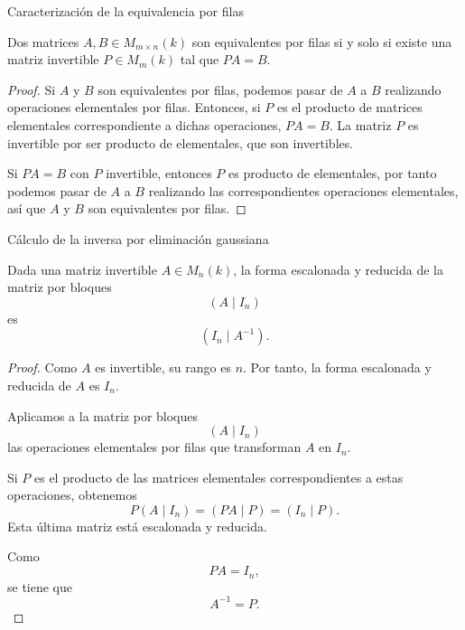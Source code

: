 \begin{frame}{Caracterización de la equivalencia por filas}

\begin{corollary}
	Dos matrices $A,B \in M_{m\times n}(k)$ son equivalentes por filas si y solo si existe una matriz invertible $P\in M_{m}(k)$ tal que $PA=B$.
\end{corollary}

\begin{proof}
	Si $A$ y $B$ son equivalentes por filas, podemos pasar de $A$ a $B$ realizando operaciones elementales por filas. Entonces, si $P$ es el producto de matrices elementales correspondiente a dichas operaciones, $PA=B$. La matriz $P$ es invertible por ser producto de elementales, que son invertibles.
	
	\medskip
	
	Si $PA=B$ con $P$ invertible, entonces $P$ es producto de elementales, por tanto podemos pasar de $A$ a $B$ realizando las correspondientes operaciones elementales, así que $A$ y $B$ son equivalentes por filas.
\end{proof}

\end{frame}

\begin{frame}[allowframebreaks, t]{Cálculo de la inversa por eliminación gaussiana}

\begin{proposition}
    Dada una matriz invertible \(A\in M_n(k)\), la forma escalonada y reducida de la matriz por bloques
    \[
    (A\mid I_n)
    \]
    es
    \[
    (I_n\mid A^{-1}).
    \]
\end{proposition}

\begin{proof}
Como \(A\) es invertible, su rango es \(n\). Por tanto, la forma escalonada y reducida de \(A\) es
\(
I_n.
\)

\medskip

Aplicamos a la matriz por bloques
\[
(A\mid I_n)
\]
las operaciones elementales por filas que transforman \(A\) en
\(I_n\).

\medskip

Si \(P\) es el producto de las matrices elementales correspondientes
a estas operaciones, obtenemos
\[
P(A\mid I_n)
=
(PA\mid P)
=
(I_n\mid P).
\]
Esta última matriz está escalonada y reducida.

\medskip

Como
\[
PA=I_n,
\]
se tiene que
\[
A^{-1}=P.
\]
\end{proof}
\end{frame}


